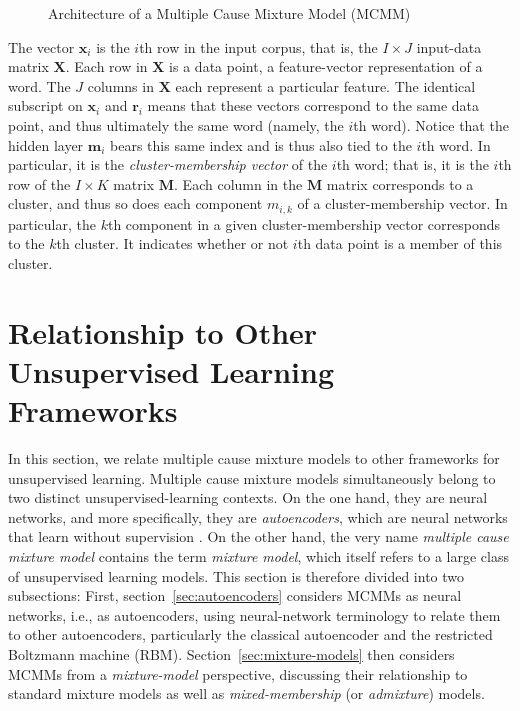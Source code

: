 \begin{figure}[t]
\begin{mdframed}
\caption{Architecture of a Multiple Cause Mixture Model (MCMM)} 
\label{fig:mcmm}
\vspace{12pt}
\end{mdframed}
\end{figure}

The vector $\mathbf{x}_i$ is the $i$th row in the 
input corpus, that is, the $I \times J$ input-data matrix $\textbf{X}$. Each 
row in $\textbf{X}$ is a data point, a feature-vector representation of a word. 
The $J$ columns in  $\textbf{X}$ each represent a particular feature.
The identical subscript on $\mathbf{x}_i$ 
and $\mathbf{r}_i$ means that these vectors correspond to the same data 
point, and thus ultimately the same word (namely, the $i$th word). Notice that the hidden 
layer $\textbf{m}_i$ bears this same index and is thus also tied to the $i$th word. In particular, it 
is the 
\emph{cluster-membership vector} of the $i$th word; that is, it is the $i$th row of 
the $I \times K$ matrix 
$\mathbf{M}$.  Each column in the $\mathbf{M}$ matrix corresponds to a cluster, and thus so does each component $m_{i,k}$ of a cluster-membership vector. In particular, the $k$th component in a given cluster-membership vector corresponds to the $k$th cluster. It indicates whether or not $i$th data point is a member of this cluster. 

\section{Relationship to Other Unsupervised Learning Frameworks}
\label{sec:context}

In this section, we relate multiple cause mixture models to other frameworks for unsupervised learning. 
Multiple cause mixture models simultaneously belong to two distinct unsupervised-learning contexts. 
On the one hand, they are neural networks, and more specifically, they are \emph{autoencoders}, which are neural networks that learn without supervision \citep{bourlard:1988, dayan-and-zemel:95}. %
On the other hand, the very name 
\emph{multiple cause mixture model} 
contains the term \emph{mixture model}, which itself refers to a large class of unsupervised learning models. 
This section is therefore divided into two subsections: First, section~\ref{sec:autoencoders} 
considers MCMMs as neural networks, i.e., as autoencoders, using neural-network terminology 
to relate them to other autoencoders, particularly the classical autoencoder and the restricted Boltzmann machine (RBM).  Section~\ref{sec:mixture-models} then 
considers MCMMs from a \emph{mixture-model} perspective, discussing their 
relationship to standard mixture models as well as \emph{mixed-membership} 
(or \emph{admixture}) models. 

